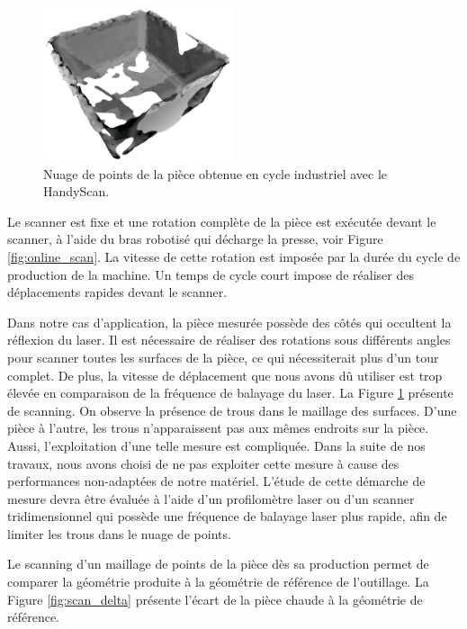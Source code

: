 \begin{figure}[thbp]
	\centering
	\includegraphics[width=0.5\textwidth]{../Chap2/Figures/online_3d_scan.png}
	\caption{Nuage de points de la pièce obtenue en cycle industriel avec le HandyScan.}
	\label{fig:online_scan_result}
\end{figure}

Le scanner est fixe et une rotation complète de la pièce est exécutée devant le scanner, à l'aide du bras robotisé qui décharge la presse, voir Figure \ref{fig:online_scan}.
La vitesse de cette rotation est imposée par la durée du cycle de production de la machine.
Un temps de cycle court impose de réaliser des déplacements rapides devant le scanner.

Dans notre cas d'application, la pièce mesurée possède des côtés qui occultent la réflexion du laser.
Il est nécessaire de réaliser des rotations sous différents angles pour scanner toutes les surfaces de la pièce, ce qui nécessiterait plus d'un tour complet.
De plus, la vitesse de déplacement que nous avons dû utiliser est trop élevée en comparaison de la fréquence de balayage du laser.
La Figure \ref{fig:online_scan_result} présente de scanning.
On observe la présence de trous dans le maillage des surfaces.
D'une pièce à l'autre, les trous n'apparaissent pas aux mêmes endroits sur la pièce.
Aussi, l'exploitation d'une telle mesure est compliquée. 
Dans la suite de nos travaux, nous avons choisi de ne pas exploiter cette mesure à cause des performances non-adaptées de notre matériel.
L'étude de cette démarche de mesure devra être évaluée à l'aide d'un profilomètre laser ou d'un scanner tridimensionnel qui possède une fréquence de balayage laser plus rapide, afin de limiter les trous dans le nuage de points.

Le scanning d'un maillage de points de la pièce dès sa production permet de comparer la géométrie produite à la géométrie de référence de l'outillage.
La Figure \ref{fig:scan_delta} présente l'écart de la pièce chaude à la géométrie de référence.

